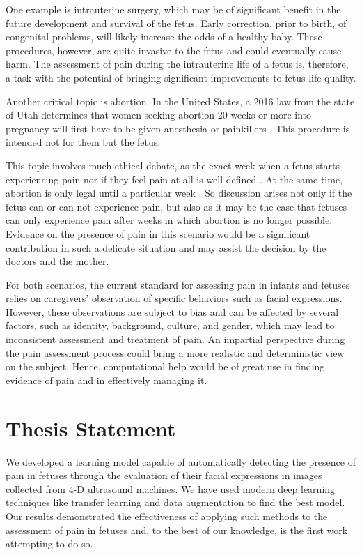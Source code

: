 One example is intrauterine surgery, which may be of significant benefit in the future development and survival of the fetus. Early correction, prior to birth, of congenital problems, will likely increase the odds of a healthy baby. These procedures, however, are quite invasive to the fetus and could eventually cause harm. The assessment of pain during the intrauterine life of a fetus is, therefore, a task with the potential of bringing significant improvements to fetus life quality. 

Another critical topic is abortion. In the United States, a 2016 law from the state of Utah determines that women seeking abortion 20 weeks or more into pregnancy will first have to be given anesthesia or painkillers \citep{healy2016nytimes}. This procedure is intended not for them but the fetus. 

This topic involves much ethical debate, as the exact week when a fetus starts experiencing pain nor if they feel pain at all is well defined \citep{jama.294.8.947}. At the same time, abortion is only legal until a particular week \citep{Derbyshire2006}. So discussion arises not only if the fetus can or can not experience pain, but also as it may be the case that fetuses can only experience pain after weeks in which abortion is no longer possible. Evidence on the presence of pain in this scenario would be a significant contribution in such a delicate situation and may assist the decision by the doctors and the mother.

For both scenarios, the current standard for assessing pain in infants and fetuses relies on caregivers' observation of specific behaviors such as facial expressions. However, these observations are subject to bias and can be affected by several factors, such as identity, background, culture, and gender, which may lead to inconsistent assessment and treatment of pain. An impartial perspective during the pain assessment process could bring a more realistic and deterministic view on the subject. Hence, computational help would be of great use in finding evidence of pain and in effectively managing it.

\section{Thesis Statement}

We developed a learning model capable of automatically detecting the presence of pain in fetuses through the evaluation of their facial expressions in images collected from 4-D ultrasound machines. We have used modern deep learning techniques like transfer learning and data augmentation to find the best model. Our results demonstrated the effectiveness of applying such methods to the assessment of pain in fetuses and, to the best of our knowledge, is the first work attempting to do so.

